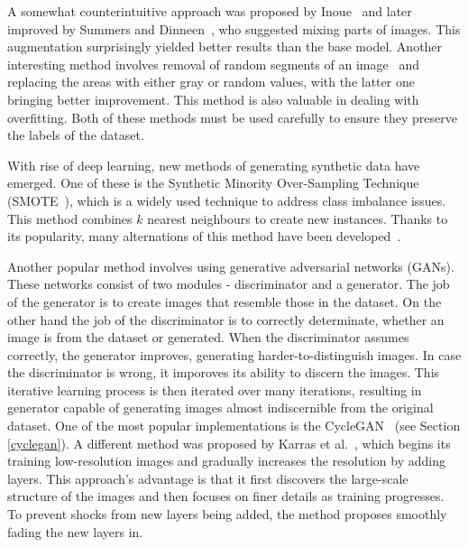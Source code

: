 
A somewhat counterintuitive approach was proposed by Inoue~\cite{combineImages} and later improved by Summers and Dinneen~\cite{combineImprove}, who suggested mixing parts of images. This augmentation surprisingly yielded better results than the base model. Another interesting method involves removal of random segments of an image~\cite{erasing} and replacing the areas with either gray or random values, with the latter one bringing better improvement. This method is also valuable in dealing with overfitting. Both of these methods must  be used carefully to ensure they preserve the labels of the dataset.

With rise of deep learning, new methods of generating synthetic data have emerged. One of these is the Synthetic Minority Over-Sampling Technique (SMOTE~\cite{smote}), which is a widely used technique to address class imbalance issues. This method combines $k$ nearest neighbours to create new instances. Thanks to its popularity, many alternations of this method have been developed~\cite{smote2,smote3,smote4}. 

Another popular method involves using generative adversarial networks (GANs). These networks consist of two modules - discriminator and a generator. The job of the generator is to create images that resemble those in the dataset. On the other hand the job of the discriminator is to correctly determinate, whether an image is from the dataset or generated. When the discriminator assumes correctly, the generator improves, generating harder-to-distinguish images. In case the discriminator is wrong, it imporoves its ability to discern the images. This iterative learning process is then iterated over many iterations, resulting in generator capable of generating images almost indiscernible from the original dataset. One of the most popular implementations is the CycleGAN~\cite{CycleGAN} (see Section \ref{cyclegan}). A different method was proposed by Karras et al.~\cite{progressivegan}, which begins its training low-resolution images and gradually increases the resolution by adding layers. This approach's advantage is that it first discovers the large-scale structure of the images and then focuses on finer details as training progresses. To prevent shocks from new layers being added, the method proposes smoothly fading the new layers in.
